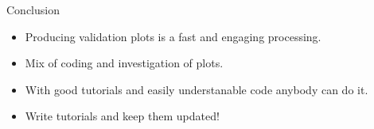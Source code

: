 \begin{frame}{Conclusion}
    \begin{itemize}
        \item Producing validation plots is a fast and engaging processing.
        \vspace{0.2cm}
        \item Mix of coding and investigation of plots.
        \vspace{0.2cm}
        \item With good tutorials and easily understanable code anybody can do it.
        \vspace{0.2cm}
        \item Write tutorials and keep them updated! 
    \end{itemize}
\end{frame}

